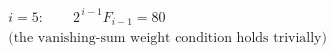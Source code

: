 \documentclass{article}
\begin{document}
\[
\begin{aligned}
&i=5:\qquad 2^{\,i-1}F_{i-1}=80\\
&\text{(the vanishing-sum weight condition holds trivially)}
\end{aligned}
\]
\end{document}
